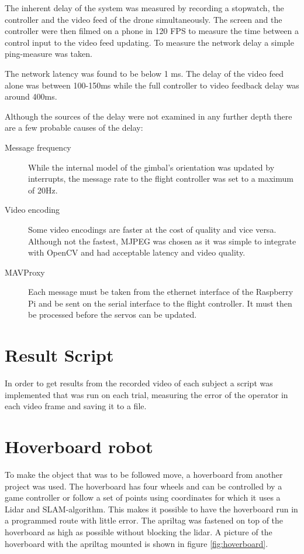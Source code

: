 \documentclass[nofilelist]{cslthse-msc}
\begin{document}
The inherent delay of the system was measured by recording a stopwatch, the controller and the video feed of the drone simultaneously. The screen and the controller were then filmed on a phone in 120 FPS to measure the time between a control input to the video feed updating. To measure the network delay a simple ping-measure was taken.

The network latency was found to be below 1 ms. The delay of the video feed alone was between 100-150ms while the full controller to video feedback delay was around 400ms. 

Although the sources of the delay were not examined in any further depth there are a few probable causes of the delay:
\begin{description}
   \item[Message frequency] 
   While the internal model of the gimbal's orientation was updated by interrupts, the message rate to the flight controller was set to a maximum of 20Hz.
   
   \item [Video encoding]
   Some video encodings are faster at the cost of quality and vice versa. Although not the fastest, MJPEG was chosen as it was simple to integrate with OpenCV and had acceptable latency and video quality.
   
   \item[MAVProxy] Each message must be taken from the ethernet interface of the Raspberry Pi and be sent on the serial interface to the flight controller. It must then be processed before the servos can be updated. 
   
\end{description}

\section{Result Script}
In order to get results from the recorded video of each subject a script was implemented that was run on each trial, measuring the error of the operator in each video frame and saving it to a file.

\section{Hoverboard robot}
To make the object that was to be followed move, a hoverboard from another project was used. The hoverboard has four wheels and can be controlled by a game controller or follow a set of points using coordinates for which it uses a Lidar and SLAM-algorithm. This makes it possible to have the hoverboard run in a programmed route with little error. The apriltag was fastened on top of the hoverboard as high as possible without blocking the lidar. A picture of the hoverboard with the apriltag mounted is shown in figure \ref{fig:hoverboard}.
\end{document}
